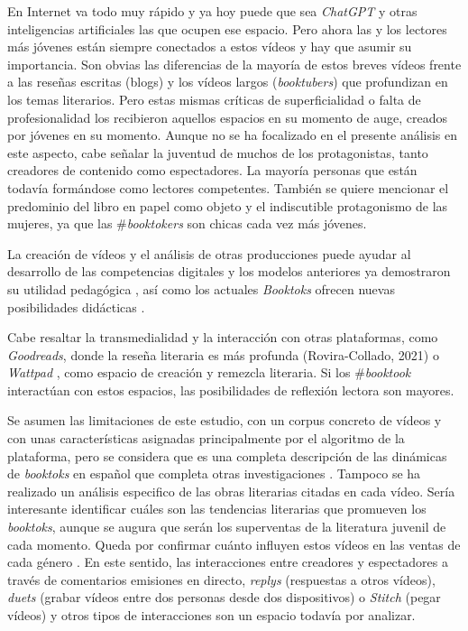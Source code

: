 En Internet va todo muy rápido y ya hoy puede que sea \emph{ChatGPT} y
otras inteligencias artificiales las que ocupen ese espacio. Pero ahora
las y los lectores más jóvenes están siempre conectados a estos vídeos y
hay que asumir su importancia. Son obvias las diferencias de la mayoría
de estos breves vídeos frente a las reseñas escritas (blogs) y los
vídeos largos (\emph{booktubers}) que profundizan en los temas
literarios. Pero estas mismas críticas de superficialidad o falta de
profesionalidad los recibieron aquellos espacios en su momento de auge,
creados por jóvenes en su momento. Aunque no se ha focalizado en el
presente análisis en este aspecto, cabe señalar la juventud de muchos de
los protagonistas, tanto creadores de contenido como espectadores. La
mayoría personas que están todavía formándose como lectores competentes.
También se quiere mencionar el predominio del libro en papel como objeto
y el indiscutible protagonismo de las mujeres, ya que las
\#\emph{booktokers} son chicas cada vez más jóvenes.

La creación de vídeos y el análisis de otras producciones puede ayudar
al desarrollo de las competencias digitales \cite{allué2023} y los
modelos anteriores ya demostraron su utilidad pedagógica \cite{paladines_Paredes_Aliagas_Marín_2021}, así como los actuales \emph{Booktoks} ofrecen nuevas
posibilidades didácticas \cite{dezuanni2021,acevedo2022}.

Cabe resaltar la transmedialidad y la interacción con otras plataformas,
como \emph{Goodreads}, donde la reseña literaria es más profunda
(Rovira-Collado, 2021) o \emph{Wattpad} \cite{garciaroca2019},
como espacio de creación y remezcla literaria. Si los \#\emph{booktook}
interactúan con estos espacios, las posibilidades de reflexión lectora
son mayores.

Se asumen las limitaciones de este estudio, con un corpus concreto de
vídeos y con unas características asignadas principalmente por el
algoritmo de la plataforma, pero se considera que es una completa
descripción de las dinámicas de \emph{booktoks} en español que completa
otras investigaciones \cite{guinez-cabara2022}. Tampoco
se ha realizado un análisis especifico de las obras literarias citadas
en cada vídeo. Sería interesante identificar cuáles son las tendencias
literarias que promueven los \emph{booktoks}, aunque se augura que serán
los superventas de la literatura juvenil de cada momento. Queda por
confirmar cuánto influyen estos vídeos en las ventas de cada género
\cite{merga2021,martens2022}. En este sentido, las
interacciones entre creadores y espectadores a través de comentarios
emisiones en directo, \emph{replys} (respuestas a otros vídeos),
\emph{duets} (grabar vídeos entre dos personas desde dos dispositivos) o
\emph{Stitch} (pegar vídeos) y otros tipos de interacciones son un
espacio todavía por analizar.

